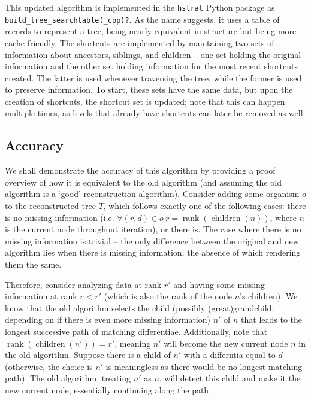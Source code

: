 This updated algorithm is implemented in the \texttt{hstrat} Python package \citep{moreno2024hstrat} as \texttt{build\_tree\_searchtable(\_cpp)?}. As the name suggests, it uses a table of records to represent a tree, being nearly equivalent in structure but being more cache-friendly. The shortcuts are implemented by maintaining two sets of information about ancestors, siblings, and children -- one set holding the original information and the other set holding information for the most recent shortcuts created. The latter is used whenever traversing the tree, while the former is used to preserve information. To start, these sets have the same data, but upon the creation of shortcuts, the shortcut set is updated; note that this can happen multiple times, as levels that already have shortcuts can later be removed as well.

\subsection{Accuracy}

We shall demonstrate the accuracy of this algorithm by providing a proof overview of how it is equivalent to the old algorithm (and assuming the old algorithm is a `good' reconstruction algorithm). Consider adding some organism $o$ to the reconstructed tree $T$, which follows exactly one of the following cases: there is no missing information (i.e. $\forall (r, d) \in o\ r = \operatorname{rank}(\operatorname{children}(n))$, where $n$ is the current node throughout iteration), or there is. The case where there is no missing information is trivial -- the only difference between the original and new algorithm lies when there is missing information, the absence of which rendering them the same. 

Therefore, consider analyzing data at rank $r'$ and having some missing information at rank $r < r'$ (which is also the rank of the node $n$'s children). We know that the old algorithm selects the child (possibly (great)grandchild, depending on if there is even more missing information) $n'$ of $n$ that leads to the longest successive path of matching differentiae. Additionally, note that $\operatorname{rank}(\operatorname{children}(n')) = r'$, meaning $n'$ will become the new current node $n$ in the old algorithm. Suppose there is a child of $n'$ with a differntia equal to $d$ (otherwise, the choice is $n'$ is meaningless as there would be no longest matching path). The old algorithm, treating $n'$ as $n$, will detect this child and make it the new current node, essentially continuing along the path. 

